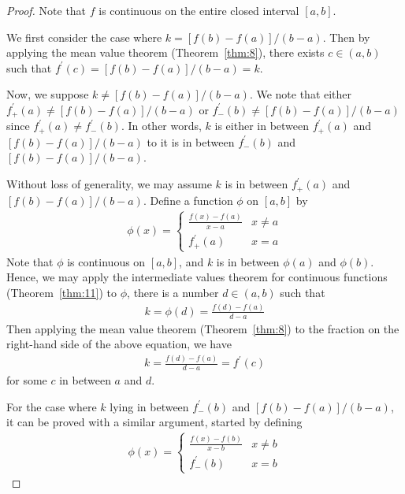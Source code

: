\documentclass[thmcnt=section, 12pt]{my-elegantbook}
\begin{document}
\begin{proof}
    Note that $f$ is continuous on the entire closed interval $[a, b]$.

    \par We first consider the case where $k = [f(b) - f(a)] / (b-a)$. Then by applying the mean value theorem (Theorem~\ref{thm:8}), there exists $c \in (a, b)$ such that $f^\prime(c) = [f(b) - f(a)] / (b-a) = k$.

    \par Now, we suppose $k \neq [f(b) - f(a)] / (b-a)$. We note that either $f^\prime_{+}(a) \neq [f(b) - f(a)] / (b-a)$ or $f^\prime_{-}(b) \neq [f(b) - f(a)] / (b-a)$ since $f^\prime_{+}(a) \neq f^\prime_{-}(b)$. In other words, $k$ is either in between $f^\prime_{+}(a)$ and $[f(b) - f(a)] / (b-a)$ to it is in between $f^\prime_{-}(b)$ and $[f(b) - f(a)] / (b-a)$.

    \par Without loss of generality, we may assume $k$ is in between $f^\prime_{+}(a)$ and $[f(b) - f(a)] / (b-a)$. Define a function $\phi$ on $[a, b]$ by
    \begin{align*}
        \phi(x) = \begin{cases}
            \frac{f(x) - f(a)}{x - a}
            &x \neq a \\ 
            f^\prime_{+}(a)
            &x = a
        \end{cases}
    \end{align*}
    Note that $\phi$ is continuous on $[a, b]$, and $k$ is in between $\phi(a)$ and $\phi(b)$. Hence, we may apply the intermediate values theorem for continuous functions (Theorem~\ref{thm:11}) to $\phi$, there is a number $d \in (a, b)$ such that 
    \begin{align*}
        k = \phi(d) = \frac{f(d) - f(a)}{d - a}
    \end{align*}
    Then applying the mean value theorem (Theorem~\ref{thm:8}) to the fraction on the right-hand side of the above equation, we have 
    \begin{align*}
        k = \frac{f(d) - f(a)}{d - a}
        = f^\prime(c)
    \end{align*}
    for some $c$ in between $a$ and $d$.

    \par For the case where $k$ lying in between $f^\prime_{-}(b)$ and $[f(b) - f(a)] / (b-a)$, it can be proved with a similar argument, started by defining
    \begin{align*}
        \phi(x) = \begin{cases}
            \frac{f(x) - f(b)}{x - b}
            &x \neq b \\ 
            f^\prime_{-}(b)
            &x = b
        \end{cases}
    \end{align*}
\end{proof}
\end{document}
